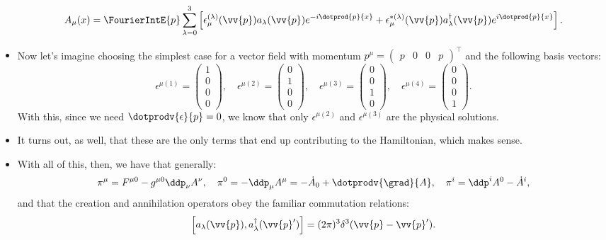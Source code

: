 \begin{itemize}
        \begin{equation}
            A_{\mu}(x) = \FourierIntE{p} \sum_{\lambda=0}^3 \left[ \epsilon_{\mu}^{(\lambda)}(\vv{p})a_{\lambda}(\vv{p})e^{-i\dotprod{p}{x}} + \epsilon_{\mu}^{*(\lambda)}(\vv{p})a_{\lambda}^{\dagger}(\vv{p})e^{i\dotprod{p}{x}} \right].
        \end{equation}
    \item Now let's imagine choosing the simplest case for a vector field with momentum $p^{\mu} = \begin{pmatrix}p & 0 & 0 & p\end{pmatrix}^{\intercal}$ and the following basis vectors:
        \begin{equation*}
            \epsilon^{\mu(1)} = \begin{pmatrix}1 \\ 0 \\ 0 \\ 0\end{pmatrix},\quad \epsilon^{\mu(2)} = \begin{pmatrix}0 \\ 1 \\ 0 \\ 0\end{pmatrix},\quad \epsilon^{\mu(3)} = \begin{pmatrix}0 \\ 0 \\ 1 \\ 0\end{pmatrix},\quad \epsilon^{\mu(4)} = \begin{pmatrix}0 \\ 0 \\ 0 \\ 1\end{pmatrix}.
        \end{equation*}
        With this, since we need $\dotprodv{\epsilon}{p}=0$, we know that only $\epsilon^{\mu(2)}$ and $\epsilon^{\mu(3)}$ are the physical solutions.
    \item It turns out, as well, that these are the only terms that end up contributing to the Hamiltonian, which makes sense.
    \item With all of this, then, we have that generally:
        \begin{equation*}
            \pi^{\mu} = F^{\mu0} - g^{\mu0}\ddp_{\nu}A^{\nu},\quad \pi^0 = -\ddp_{\mu}A^{\mu} = -\dot{A}_0 + \dotprodv{\grad}{A},\quad \pi^i = \ddp^iA^0 - \dot{A}^i,
        \end{equation*}
        and that the creation and annihilation operators obey the familiar commutation relations:   
        \begin{equation}
            \left[ a_{\lambda}(\vv{p}),a_{\lambda}^{\dagger}(\vv{p}') \right] = (2\pi)^3 \delta^3(\vv{p}-\vv{p}').
        \end{equation}
\end{itemize}